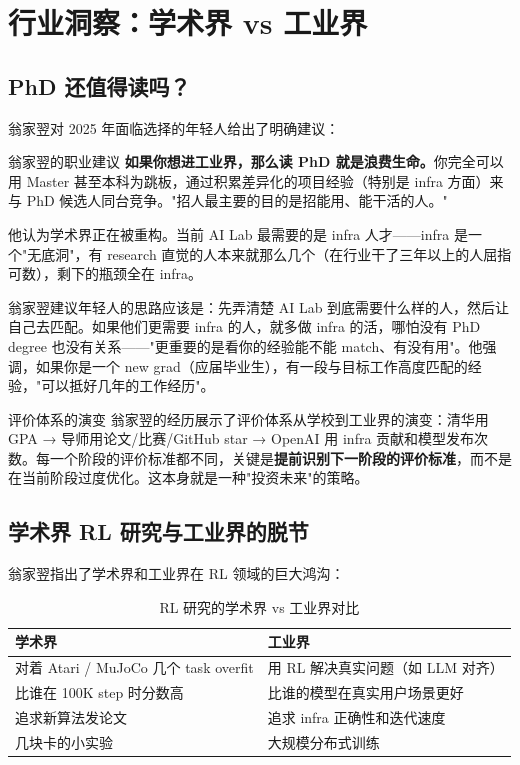 \section{行业洞察：学术界 vs 工业界}

\subsection{PhD 还值得读吗？}

翁家翌对 2025 年面临选择的年轻人给出了明确建议：

\begin{importantbox}{翁家翌的职业建议}
\textbf{如果你想进工业界，那么读 PhD 就是浪费生命。}你完全可以用 Master 甚至本科为跳板，通过积累差异化的项目经验（特别是 infra 方面）来与 PhD 候选人同台竞争。"招人最主要的目的是招能用、能干活的人。"
\end{importantbox}

他认为学术界正在被重构。当前 AI Lab 最需要的是 infra 人才——infra 是一个"无底洞"，有 research 直觉的人本来就那么几个（在行业干了三年以上的人屈指可数），剩下的瓶颈全在 infra。

翁家翌建议年轻人的思路应该是：先弄清楚 AI Lab 到底需要什么样的人，然后让自己去匹配。如果他们更需要 infra 的人，就多做 infra 的活，哪怕没有 PhD degree 也没有关系——"更重要的是看你的经验能不能 match、有没有用"。他强调，如果你是一个 new grad（应届毕业生），有一段与目标工作高度匹配的经验，"可以抵好几年的工作经历"。

\begin{knowledgebox}{评价体系的演变}
翁家翌的经历展示了评价体系从学校到工业界的演变：清华用 GPA → 导师用论文/比赛/GitHub star → OpenAI 用 infra 贡献和模型发布次数。每一个阶段的评价标准都不同，关键是\textbf{提前识别下一阶段的评价标准}，而不是在当前阶段过度优化。这本身就是一种"投资未来"的策略。
\end{knowledgebox}

\subsection{学术界 RL 研究与工业界的脱节}

翁家翌指出了学术界和工业界在 RL 领域的巨大鸿沟：

\begin{table}[H]
\centering
\begin{tabular}{ll}
\toprule
\textbf{学术界} & \textbf{工业界} \\
\midrule
对着 Atari / MuJoCo 几个 task overfit & 用 RL 解决真实问题（如 LLM 对齐） \\
比谁在 100K step 时分数高 & 比谁的模型在真实用户场景更好 \\
追求新算法发论文 & 追求 infra 正确性和迭代速度 \\
几块卡的小实验 & 大规模分布式训练 \\
\bottomrule
\end{tabular}
\caption{RL 研究的学术界 vs 工业界对比}
\end{table}

